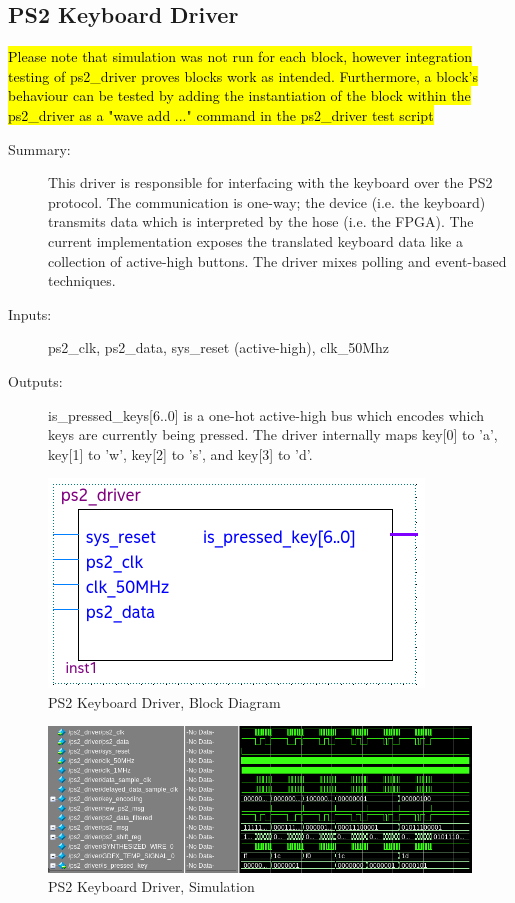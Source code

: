 \documentclass[a4paper]{article}
\begin{document}
\subsection{PS2 Keyboard Driver}
    \hl{Please note that simulation was not run for each block, however integration testing of ps2\_driver proves blocks work as intended.  Furthermore, a block's behaviour can be tested by adding the instantiation of the block within the ps2\_driver as a "wave add ..." command in the ps2\_driver test script}
    \begin{description}
        \item[Summary: ] This driver is responsible for interfacing with the keyboard over the PS2 protocol.  The communication is one-way;  the device (i.e. the keyboard) transmits data which is interpreted by the hose (i.e. the FPGA).  The current implementation exposes the translated keyboard data like a collection of active-high buttons.  The driver mixes polling and event-based techniques.
        \item[Inputs: ] ps2\_clk, ps2\_data, sys\_reset (active-high), clk\_50Mhz
        \item[Outputs: ] is\_pressed\_keys[6..0] is a one-hot active-high bus which encodes which keys are currently being pressed.  The driver internally maps key[0] to 'a', key[1] to 'w', key[2] to 's', and key[3] to 'd'.
    \end{description}
    
    \vspace{.25 in}
    \begin{figure}[h]
      \centering
        \includegraphics[width=.5\textwidth]{Images/silas_blocks/ps2_driver_bd.png}
    	\caption{PS2 Keyboard Driver, Block Diagram}
        \label{fig:keyboard_driver_bd}
    \end{figure}
    
    \vspace{.25 in}
    \begin{figure}[h]
      \centering
        \includegraphics[width=5.91in]{Images/silas_sims/ps2_driver_sim.png}
    	\caption{PS2 Keyboard Driver, Simulation}
        \label{fig:keyboard_driver_sim}
    \end{figure}
\end{document}
